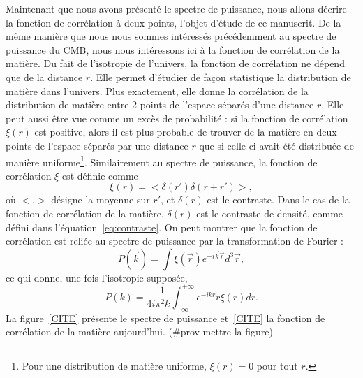 \documentclass[11pt, twoside, a4paper, openright]{report}
\begin{document}
Maintenant que nous avons présenté le spectre de puissance, nous allons décrire la fonction de corrélation à deux points, l'objet d'étude de ce manuscrit. De la même manière que nous nous sommes intéressés précédemment au spectre de puissance du CMB, nous nous intéressons ici à la fonction de corrélation de la matière. Du fait de l'isotropie de l'univers, la fonction de corrélation ne dépend que de la distance $r$. Elle permet d'étudier de façon statistique la distribution de matière dans l'univers. Plus exactement, elle donne la corrélation de la distribution de matière entre 2 points de l'espace séparés d'une distance $r$. Elle peut aussi être vue comme un excès de probabilité : si la fonction de corrélation $\xi(r)$ est positive, alors il est plus probable de trouver de la matière en deux points de l'espace séparés par une distance $r$ que si celle-ci avait été distribuée de manière uniforme\footnote{Pour une distribution de matière uniforme, $\xi(r) = 0$ pour tout $r$.}. Similairement au spectre de puissance, la fonction de corrélation $\xi$ est définie comme
\begin{equation}
  \label{eq:def_cf}
  \xi(r) = < \delta(r') \delta(r + r') >,
\end{equation}
où $<.>$ désigne la moyenne sur $r'$, et $\delta(r)$ est le contraste. Dans le cas de la fonction de corrélation de la matière, $\delta(r)$ est le contraste de densité, comme défini dans l'équation~\ref{eq:contraste}.
On peut montrer que la fonction de corrélation est reliée au spectre de puissance par la transformation de Fourier :
\begin{equation}
  \label{eq:cf_tf}
  P(\vec{k}) = \int \xi(\vec{r}) e^{- i \vec{k} \vec{r}} d^3\vec{r} ,
\end{equation}
ce qui donne, une fois l'isotropie supposée,
\begin{equation}
  \label{eq:cf_tf2}
  P(k) = \frac{-1}{4 i \pi^2 k} \int_{-\infty}^{+\infty} e^{- i k r} r \xi(r) dr .
\end{equation}
La figure~\ref{CITE} présente le spectre de puissance et~\ref{CITE} la fonction de corrélation de la matière aujourd'hui. (\#prov mettre la figure)
\end{document}
